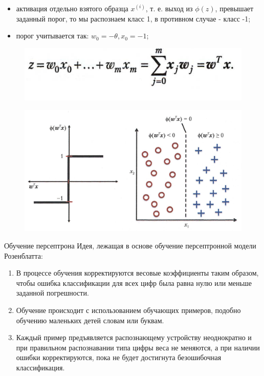 \documentclass{beamer}
\begin{document}
\begin{frame}[t]
	\begin{itemize}
		\item активация отдельно взятого образца $x^{(i)}$, т. е. выход из $\phi(z)$, превышает заданный порог, то мы распознаем класс 1, в противном случае - класс -1;
		\item порог учитывается так: $w_0 = -\theta, x_0 = -1$;
	\end{itemize}
	\begin{figure}[h]
		\centering
		\includegraphics[scale=0.4]{images/lec03-pic04.png}
	\end{figure}
	\begin{figure}[h]
		\centering
		\includegraphics[scale=0.25]{images/lec03-pic05.png}
	\end{figure}
\end{frame}

\begin{frame}[t]{Обучение персептрона}
	\linespread{1.0}
	Идея, лежащая в основе обучение персептронной модели Розенблатта:
	\begin{enumerate}
		\item В процессе обучения корректируются весовые коэффициенты таким образом, чтобы ошибка классификации для всех цифр была равна нулю или меньше заданной погрешности. 
		\item Обучение происходит с использованием обучающих примеров, подобно обучению маленьких детей словам или буквам. 
		\item Каждый пример предъявляется распознающему устройству неоднократно и при правильном распознавании типа цифры веса не меняются, а при наличии ошибки корректируются, пока не будет достигнута безошибочная классификация.		
	\end{enumerate}
\end{frame}
\end{document}
